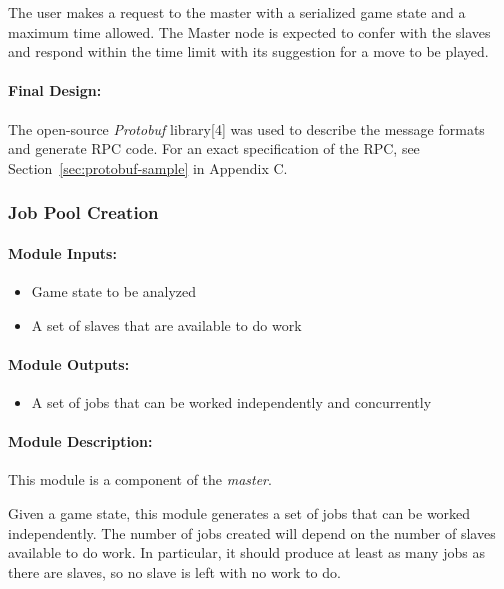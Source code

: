 \documentclass[pdftex,12pt,a4paper]{article}
\begin{document}
The user makes a request to the master with a serialized game state and a maximum time allowed. The Master node is expected to confer with the slaves and respond within the time limit with its suggestion for a move to be played.

\paragraph{Final Design:\\}
The open-source \emph{Protobuf} library[4] was used to describe the message formats and generate RPC code. For an exact specification of the RPC, see Section~\ref{sec:protobuf-sample} in Appendix C.

\subsubsection{Job Pool Creation}

\paragraph{Module Inputs:}
\begin{itemize}
\item Game state to be analyzed
\item A set of slaves that are available to do work
\end{itemize}

\paragraph{Module Outputs:}
\begin{itemize}
\item A set of jobs that can be worked independently and concurrently
\end{itemize}

\paragraph{Module Description:\\}
This module is a component of the \emph{master}.

Given a game state, this module generates a set of jobs that can be worked independently. The number of jobs created will depend on the number of slaves available to do work. In particular, it should produce at least as many jobs as there are slaves, so no slave is left with no work to do.
\end{document}
